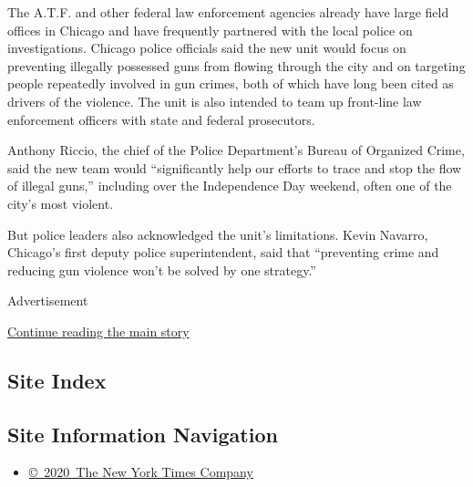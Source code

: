 The A.T.F. and other federal law enforcement agencies already have large
field offices in Chicago and have frequently partnered with the local
police on investigations. Chicago police officials said the new unit
would focus on preventing illegally possessed guns from flowing through
the city and on targeting people repeatedly involved in gun crimes, both
of which have long been cited as drivers of the violence. The unit is
also intended to team up front-line law enforcement officers with state
and federal prosecutors.

Anthony Riccio, the chief of the Police Department's Bureau of Organized
Crime, said the new team would ``significantly help our efforts to trace
and stop the flow of illegal guns,'' including over the Independence Day
weekend, often one of the city's most violent.

But police leaders also acknowledged the unit's limitations. Kevin
Navarro, Chicago's first deputy police superintendent, said that
``preventing crime and reducing gun violence won't be solved by one
strategy.''

Advertisement

\protect\hyperlink{after-bottom}{Continue reading the main story}

\hypertarget{site-index}{%
\subsection{Site Index}\label{site-index}}

\hypertarget{site-information-navigation}{%
\subsection{Site Information
Navigation}\label{site-information-navigation}}

\begin{itemize}
\tightlist
\item
  \href{https://help.nytimes3xbfgragh.onion/hc/en-us/articles/115014792127-Copyright-notice}{©~2020~The
  New York Times Company}
\end{itemize}

